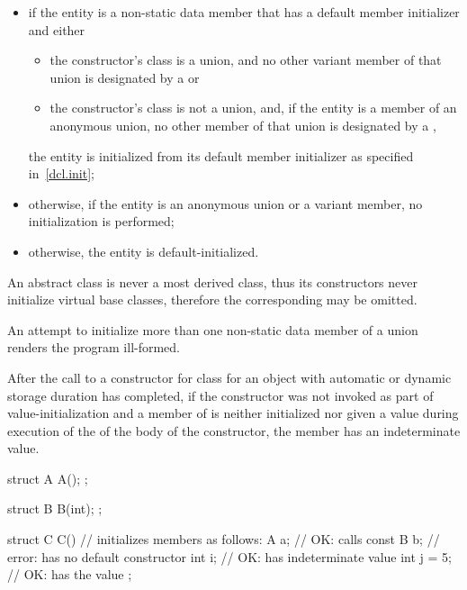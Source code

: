 \begin{itemize}
\item if the entity is a non-static data member that has
a default member initializer and either

\begin{itemize}
\item the constructor's class is a union, and no other variant
member of that union is designated by a  or

\item the constructor's class is not a union, and, if the entity is a member of an
anonymous union, no other member of that union is designated by a
,
\end{itemize}

the entity is initialized from its default member initializer
as specified in~\ref{dcl.init};

\item otherwise, if the entity is an anonymous union or a variant member, no initialization is performed;

\item otherwise, the entity is default-initialized.
\end{itemize}

\begin{note} An abstract class is never a most derived
class, thus its constructors never initialize virtual base classes, therefore the
corresponding  may be omitted. \end{note}
An attempt to initialize more than one non-static data member of a union renders the
program ill-formed.
%
%
\begin{note}
After the call to a constructor for class
for an object with automatic or dynamic storage duration
has completed, if
the constructor was not invoked as part of value-initialization and
a member of
is neither initialized nor
given a value
during execution of the  of the body of the constructor,
the member has an indeterminate value.
\end{note}
\begin{example}
\begin{codeblock}
struct A {
  A();
};

struct B {
  B(int);
};

struct C {
  C() { }               // initializes members as follows:
  A a;                  // OK: calls 
  const B b;            // error:  has no default constructor
  int i;                // OK:  has indeterminate value
  int j = 5;            // OK:  has the value 
};
\end{codeblock}
\end{example}

